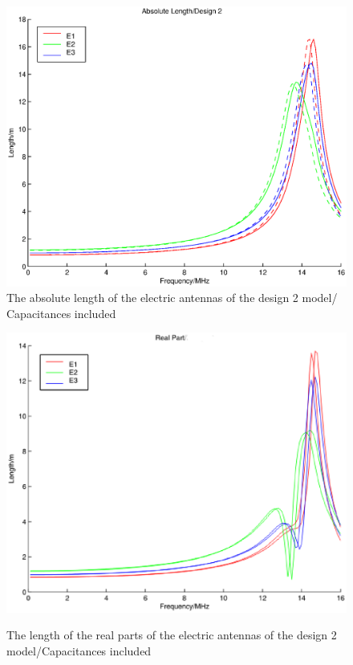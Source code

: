 \documentclass[a4paper,14pt]{extbook}
\begin{document}
\newpage
\begin{figure}
\begin{center}
\includegraphics[scale=0.45]{HeffLengthAbsD2_caps.eps}\\
\caption{The absolute length of the electric antennas of the  design 2 model/ Capacitances included} \label{fig_Heff_length_abs_caps_D2}
\includegraphics[scale=0.45]{HeffLengthRealD2_caps.eps} \\
\caption{The length of the real parts of the electric antennas of the  design 2 model/Capacitances included} \label{fig_Heff_length_real_caps_D2}

\end{center}
\end{figure}
\end{document}
